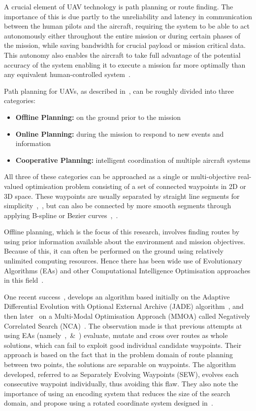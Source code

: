 \documentclass[10pt,a4paper, oneside, conference]{IEEEtran}
\begin{document}
	A crucial element of UAV technology is path planning or route finding.
	The importance of this is due partly to the unreliability and latency in communication between the human pilots and the aircraft, requiring the system to be able to act autonomously either throughout the entire mission or during certain phases of the mission, while saving bandwidth for crucial payload or mission critical data. 
	This autonomy also enables the aircraft to take full advantage of the potential accuracy of the system enabling it to execute a mission far more optimally than any equivalent human-controlled system~\cite{Goerzen2010}.
	
	Path planning for UAVs, as described in~\cite{Yang2015}, can be roughly divided into three categories:
	\begin{itemize}
	\item \textbf{Offline Planning:} on the ground prior to the mission
	\item \textbf{Online Planning:} during the mission to respond to new events and information
	\item \textbf{Cooperative Planning:} intelligent coordination of multiple aircraft systems
	\end{itemize} 
	All three of these categories can be approached as a single or multi-objective real-valued optimisation problem consisting of a set of connected waypoints in 2D or 3D space. These waypoints are usually separated by straight line segments for simplicity~\cite{Zheng2005},~\cite{Yang2015}, but can also be connected by more smooth segments through applying B-spline or Bezier curves~\cite{Besada-portas2010},~\cite{Pehlivanoglu2007}.
	
	Offline planning, which is the focus of this research, involves finding routes by using prior information available about the environment and mission objectives. Because of this, it can often be performed on the ground using relatively unlimited computing resources.
	Hence there has been wide use of Evolutionary Algorithms (EAs) and other Computational Intelligence Optimisation approaches in this field~\cite{Dasa2011}. 
	
	One recent success~\cite{Yang2015}, develops an algorithm based initially on the Adaptive Differential Evolution with Optional External Archive (JADE) algorithm~\cite{Zhang2009}, and then later~\cite{Yang2016} on a Multi-Modal Optimisation Approach (MMOA) called Negatively Correlated Search (NCA)~\cite{Tang2016}.
	The observation made is that previous attempts at using EAs (namely~\cite{Besada-portas2013},~\cite{Besada-portas2010}\&~\cite{Zheng2005}) evaluate, mutate and cross over routes as whole solutions, which can fail to exploit good individual candidate waypoints.
	Their approach is based on the fact that in the problem domain of route planning between two points, the solutions are separable on waypoints.
	The algorithm developed, referred to as Separately Evolving Waypoints (SEW), evolves each consecutive waypoint individually, thus avoiding this flaw.
	They also note the importance of using an encoding system that reduces the size of the search domain, and propose using a rotated coordinate system designed in~\cite{Yang2014}.
	
\end{document}
